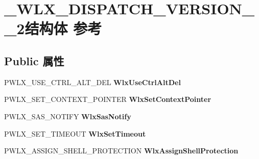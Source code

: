 \hypertarget{struct___w_l_x___d_i_s_p_a_t_c_h___v_e_r_s_i_o_n__1__2}{}\section{\+\_\+\+W\+L\+X\+\_\+\+D\+I\+S\+P\+A\+T\+C\+H\+\_\+\+V\+E\+R\+S\+I\+O\+N\+\_\+\_\+2结构体 参考}
\label{struct___w_l_x___d_i_s_p_a_t_c_h___v_e_r_s_i_o_n__1__2}
\subsection*{Public 属性}
\begin{DoxyCompactItemize}
\item 
\mbox{\label{struct___w_l_x___d_i_s_p_a_t_c_h___v_e_r_s_i_o_n__1__2_af6af2e6b8116f1d83e77dc0f04a50199}} 
P\+W\+L\+X\+\_\+\+U\+S\+E\+\_\+\+C\+T\+R\+L\+\_\+\+A\+L\+T\+\_\+\+D\+EL {\bfseries Wlx\+Use\+Ctrl\+Alt\+Del}
\item 
\mbox{\label{struct___w_l_x___d_i_s_p_a_t_c_h___v_e_r_s_i_o_n__1__2_ae7143f5779195360f5c22cfc63a973f0}} 
P\+W\+L\+X\+\_\+\+S\+E\+T\+\_\+\+C\+O\+N\+T\+E\+X\+T\+\_\+\+P\+O\+I\+N\+T\+ER {\bfseries Wlx\+Set\+Context\+Pointer}
\item 
\mbox{\label{struct___w_l_x___d_i_s_p_a_t_c_h___v_e_r_s_i_o_n__1__2_ad1ea2c2e0f82887962f9316d23a2c617}} 
P\+W\+L\+X\+\_\+\+S\+A\+S\+\_\+\+N\+O\+T\+I\+FY {\bfseries Wlx\+Sas\+Notify}
\item 
\mbox{\label{struct___w_l_x___d_i_s_p_a_t_c_h___v_e_r_s_i_o_n__1__2_a877b534177c2374d68b55f54cad33612}} 
P\+W\+L\+X\+\_\+\+S\+E\+T\+\_\+\+T\+I\+M\+E\+O\+UT {\bfseries Wlx\+Set\+Timeout}
\item 
\mbox{\label{struct___w_l_x___d_i_s_p_a_t_c_h___v_e_r_s_i_o_n__1__2_a944e028bdcccad71c8bb10caf9e79b29}} 
P\+W\+L\+X\+\_\+\+A\+S\+S\+I\+G\+N\+\_\+\+S\+H\+E\+L\+L\+\_\+\+P\+R\+O\+T\+E\+C\+T\+I\+ON {\bfseries Wlx\+Assign\+Shell\+Protection}

\end{DoxyCompactItemize}
